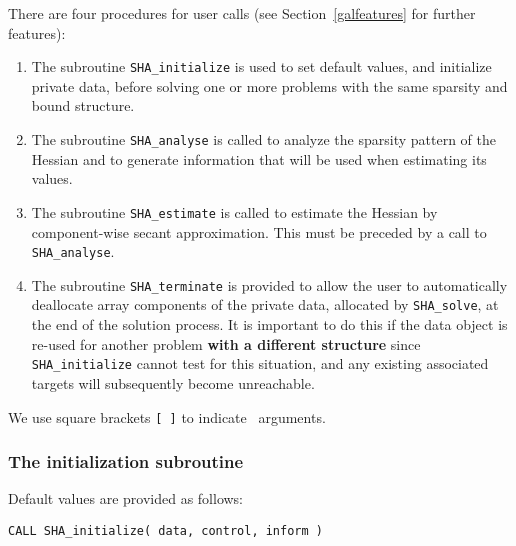 \documentclass{galahad}
\newcommand{\packagename}{SHA}
\begin{document}

\galarguments
There are four procedures for user calls
(see Section~\ref{galfeatures} for further features):

\begin{enumerate}
\item The subroutine
      {\tt \packagename\_initialize}
      is used to set default values, and initialize private data,
      before solving one or more problems with the
      same sparsity and bound structure.
\item The subroutine
      {\tt \packagename\_analyse}
      is called to analyze the sparsity pattern of the Hessian
      and to generate information that will be used when estimating
      its values.
\item The subroutine
      {\tt \packagename\_estimate}
      is called to estimate the Hessian by component-wise secant
      approximation. This must be preceded by a call to
      {\tt \packagename\_analyse}.
\item The subroutine
      {\tt \packagename\_terminate}
      is provided to allow the user to automatically deallocate array
       components of the private data, allocated by
       {\tt \packagename\_solve},
       at the end of the solution process.
       It is important to do this if the data object is re-used for another
       problem {\bf with a different structure}
       since {\tt \packagename\_initialize} cannot test for this situation,
       and any existing associated targets will subsequently become unreachable.
\end{enumerate}
We use square brackets {\tt [ ]} to indicate \optional\ arguments.


\subsubsection{The initialization subroutine}\label{subinit}
 Default values are provided as follows:
\vspace*{1mm}

\hspace{8mm}
{\tt CALL \packagename\_initialize( data, control, inform )}
\end{document}
